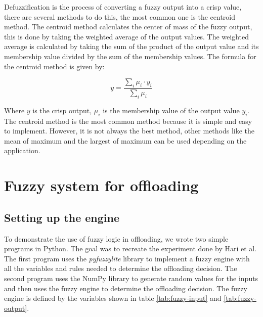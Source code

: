 Defuzzification is the process of converting a fuzzy output into a crisp value, there are several methods to do this,
the most common one is the centroid method. The centroid method calculates the center of mass of the fuzzy output, this
is done by taking the weighted average of the output values. The weighted average is calculated by taking the sum of
the product of the output value and its membership value divided by the sum of the membership values. The formula for
the centroid method is given by:

\begin{equation}
	y = \frac{\sum_{i} \mu_i \cdot y_i}{\sum_{i} \mu_i}
\end{equation}

Where $y$ is the crisp output, $\mu_i$ is the membership value of the output value $y_i$. The centroid method is the
most common method because it is simple and easy to implement. However, it is not always the best method, other methods
like the mean of maximum and the largest of maximum can be used depending on the application.

\section{Fuzzy system for offloading}
\label{sec:fuzzy-offloading}

\subsection{Setting up the engine}
\label{subsec:fuzzy-setup}

To demonstrate the use of fuzzy logic in offloading, we wrote two simple programs in Python. The goal was to recreate
the experiment done by Hari et al.\cite{Hari-et-al-2018} The first program uses the \textit{pyfuzzylite}\cite{fuzzylite}
library to implement a fuzzy engine with all the variables and rules needed to determine the offloading decision. The
second program uses the NumPy library to generate random values for the inputs and then uses the fuzzy engine to determine
the offloading decision. The fuzzy engine is defined by the variables shown in table \ref{tab:fuzzy-input} and
\ref{tab:fuzzy-output}.

